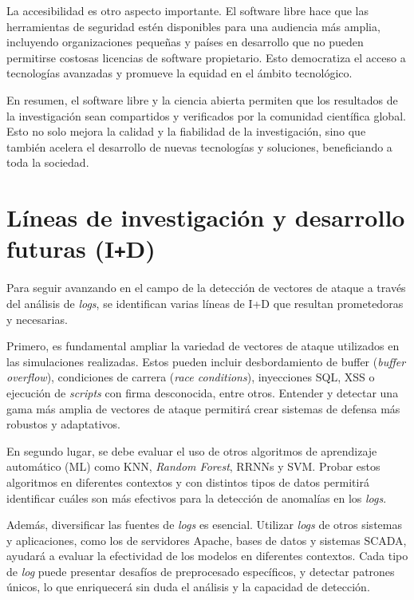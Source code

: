 La accesibilidad es otro aspecto importante. El software libre hace que las herramientas de seguridad estén disponibles para una audiencia más amplia, incluyendo organizaciones pequeñas y países en desarrollo que no pueden permitirse costosas licencias de software propietario. Esto democratiza el acceso a tecnologías avanzadas y promueve la equidad en el ámbito tecnológico.

En resumen, el software libre y la ciencia abierta permiten que los resultados de la investigación sean compartidos y verificados por la comunidad científica global. Esto no solo mejora la calidad y la fiabilidad de la investigación, sino que también acelera el desarrollo de nuevas tecnologías y soluciones, beneficiando a toda la sociedad.


\newpage

\section{Líneas de investigación y desarrollo futuras (I\texttt{+}D)}

\vspace{4mm}

Para seguir avanzando en el campo de la detección de vectores de ataque a través del análisis de \textit{logs}, se identifican varias líneas de \gls{I+D} que resultan prometedoras y necesarias.

Primero, es fundamental ampliar la variedad de vectores de ataque utilizados en las simulaciones realizadas. Estos pueden incluir desbordamiento de buffer (\textit{buffer overflow}), condiciones de carrera (\textit{race conditions}), inyecciones \gls{SQL}, \gls{XSS} o ejecución de \textit{scripts} con firma desconocida, entre otros. Entender y detectar una gama más amplia de vectores de ataque permitirá crear sistemas de defensa más robustos y adaptativos.

En segundo lugar, se debe evaluar el uso de otros algoritmos de aprendizaje automático (\gls{ML}) como \gls{KNN}, \textit{Random Forest}, \gls{RRNN}s y \gls{SVM}. Probar estos algoritmos en diferentes contextos y con distintos tipos de datos permitirá identificar cuáles son más efectivos para la detección de anomalías en los \textit{logs}.

Además, diversificar las fuentes de \textit{logs} es esencial. Utilizar \textit{logs} de otros sistemas y aplicaciones, como los de servidores Apache, bases de datos y sistemas \gls{SCADA}, ayudará a evaluar la efectividad de los modelos en diferentes contextos. Cada tipo de \textit{log} puede presentar desafíos de preprocesado específicos, y detectar patrones únicos, lo que enriquecerá sin duda el análisis y la capacidad de detección.

